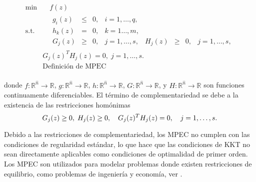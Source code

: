 \begin{equation}
\begin{aligned}
\min  &\quad  f(z)  \\
\text{s.t.} &\quad \begin{matrix} g_i(z)& \leq& 0, &i=1,\ldots,q, \\ h_k(z) &=& 0,&k=1\ldots,m, \\
 G_j(z) &\geq& 0, & j=1,\ldots,s,& H_j(z) &\geq& 0, & j=1,\ldots,s, \end{matrix}
\\&G_j(z)^T H_j(z) = 0,\; j=1,\ldots,s. \\
&\text{Definición de MPEC} \\
\end{aligned}  
\label{eq:DefMpec}
\end{equation}

donde $f: \mathbb{R}^{\hat{n}} \to \mathbb{R}$, $g: \mathbb{R}^{\hat{n}} \to \mathbb{R}$, $h: \mathbb{R}^{\hat{n}} \to \mathbb{R}$, $G: \mathbb{R}^{\hat{n}} \to \mathbb{R}$, y $H: \mathbb{R}^{\hat{n}} \to \mathbb{R}$ son funciones continuamente diferenciables. 
El término de complementariedad se debe a la existencia de las restricciones hom\'onimas 
\begin{equation}
    G_j(z) \geq 0, \; H_j(z) \geq 0, \quad G_j(z)^T H_j(z) = 0,\quad  j=1,\ldots,s. \\ \label{eq:RestriccionesComplementariedadAbstracto}
\end{equation}

Debido a las restricciones de complementariedad, los MPEC no cumplen con las condiciones de regularidad estándar, lo que hace que las condiciones de KKT no sean directamente aplicables como condiciones de optimalidad de primer orden. Los MPEC son utilizados para modelar problemas donde existen restricciones de equilibrio, como problemas de ingeniería y economía, ver \cite{Flegel2003AFJ,DempeyZemkoho2020}.



